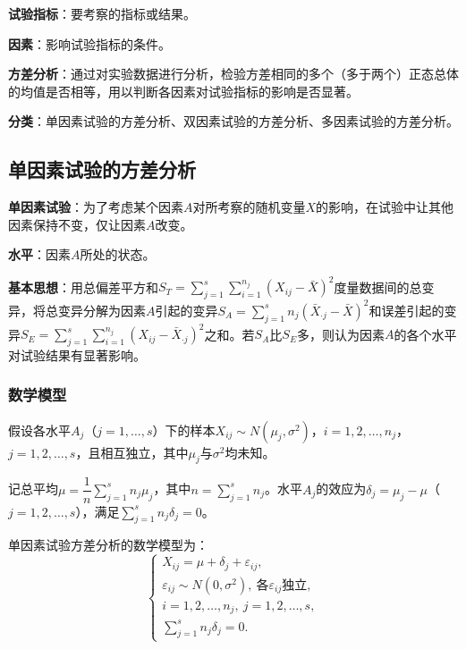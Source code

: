 \documentclass[11pt,a4paper]{report}
\theoremstyle{definition}
\theoremstyle{plain}
\begin{document}
\textbf{试验指标}：要考察的指标或结果。

\textbf{因素}：影响试验指标的条件。

\textbf{方差分析}：通过对实验数据进行分析，检验方差相同的多个（多于两个）正态总体的均值是否相等，用以判断各因素对试验指标的影响是否显著。

\textbf{分类}：单因素试验的方差分析、双因素试验的方差分析、多因素试验的方差分析。


\subsection{单因素试验的方差分析}

\textbf{单因素试验}：为了考虑某个因素$A$对所考察的随机变量$X$的影响，在试验中让其他因素保持不变，仅让因素$A$改变。

\textbf{水平}：因素$A$所处的状态。

\textbf{基本思想}：用总偏差平方和$S_T=\sum_{j=1}^{s}\sum_{i=1}^{n_j}(X_{ij}-\bar{X})^2$度量数据间的总变异，将总变异分解为因素$A$引起的变异$S_A=\sum_{j=1}^{s}n_j(\bar{X}_{\cdot j}-\bar{X})^2$和误差引起的变异$S_E=\sum_{j=1}^{s}\sum_{i=1}^{n_j}(X_{ij}-\bar{X}_{\cdot j})^2$之和。若$S_A$比$S_E$多，则认为因素$A$的各个水平对试验结果有显著影响。

\subsubsection{数学模型}

假设各水平$A_j$（$j=1,\ldots,s$）下的样本$X_{ij}\sim N(\mu_j,\sigma^2)$，$i=1,2,\ldots,n_j$，$j=1,2,\ldots,s$，且相互独立，其中$\mu_j$与$\sigma^2$均未知。

记总平均$\mu=\dfrac{1}{n}\sum_{j=1}^{s}n_j\mu_j$，其中$n=\sum_{j=1}^{s}n_j$。水平$A_j$的效应为$\delta_j=\mu_j-\mu$（$j=1,2,\ldots,s$），满足$\sum_{j=1}^{s}n_j\delta_j=0$。

单因素试验方差分析的数学模型为：
\[
\begin{cases}
X_{ij}=\mu+\delta_j+\varepsilon_{ij},\\
\varepsilon_{ij}\sim N(0,\sigma^2),\ \text{各}\varepsilon_{ij}\text{独立},\\
i=1,2,\ldots,n_j,\ j=1,2,\ldots,s,\\
\sum_{j=1}^{s}n_j\delta_j=0.
\end{cases}
\]
\end{document}
